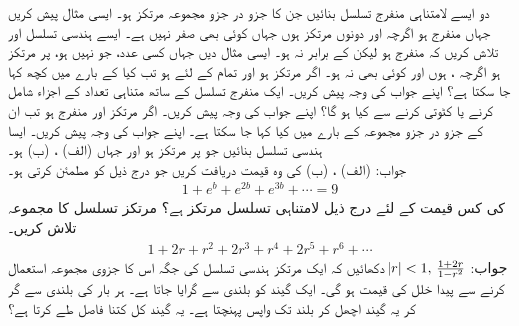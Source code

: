 دو ایسے لامتناہی منفرج تسلسل بنائیں جن کا جزو در جزو مجموعہ مرتکز ہو۔
ایسی مثال پیش کریں جہاں  منفرج ہو اگرچہ  اور  دونوں مرتکز ہوں جہاں کوئی  بھی صفر نہیں ہے۔
ایسے ہندسی تسلسل  اور  تلاش کریں کہ  منفرج ہو لیکن  کے برابر نہ ہو۔
ایسی مثال دیں جہاں  کسی عدد، جو   نہیں ہو،  پر مرتکز ہو  اگرچہ ،  ہوں اور کوئی  بھی  نہ ہو۔ 
اگر  مرتکز ہو اور تمام  کے لئے  ہو تب کیا  کے بارے میں کچھ کہا جا سکتا ہے؟ اپنے جواب کی وجہ پیش کریں۔ 
ایک منفرج تسلسل کے ساتھ متناہی تعداد کے اجزاء شامل کرنے یا کٹوتی کرنے  سے کیا ہو گا؟ اپنے جواب کی وجہ پیش کریں۔ 
اگر  مرتکز اور  منفرج ہو تب ان کے جزو در جزو مجموعہ  کے بارے میں کیا کہا جا سکتا ہے۔ اپنے جواب کی وجہ پیش کریں۔
ایسا ہندسی تسلسل  بنائیں جو  پر مرتکز ہو اور جہاں (الف) ، (ب)  ہو۔\\
جواب:\quad
(الف) ، (ب) 
 کی وہ قیمت دریافت کریں جو درج ذیل کو مطمئن کرتی ہو۔
\begin{align*}
1+e^b+e^{2b}+e^{3b}+\cdots=9
\end{align*}
 کی کس قیمت کے لئے درج ذیل لامتناہی تسلسل مرتکز ہے؟ مرتکز تسلسل کا مجموعہ تلاش کریں۔ 
\begin{align*}
1+2r+r^2+2r^3+r^4+2r^5+r^6+\cdots
\end{align*}
جواب:\quad
$\abs{r}<1,\, \tfrac{1+2r}{1-r^2}$
دکھائیں کہ ایک مرتکز ہندسی تسلسل کی جگہ اس کا جزوی مجموعہ  استعمال کرنے سے پیدا خلل  کی قیمت  ہو گی۔ 
ایک گیند کو  بلندی سے گرایا جاتا ہے۔ ہر بار  کی بلندی سے گر کر یہ گیند اچھل کر  بلند تک واپس پہنچتا ہے۔ یہ گیند کل کتنا فاصل طے کرتا ہے؟\\
